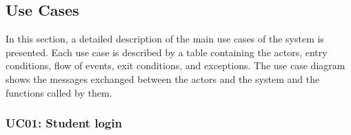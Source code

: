 \subsection{Use Cases}
\label{subsec:use-cases}

\par In this section, a detailed description of the main use cases of the system is presented. 
Each use case is described by a table containing the actors, entry conditions, flow of events, exit conditions, and exceptions.
The use case diagram shows the messages exchanged between the actors and the system and the functions called by them.


\subsubsection{UC01: Student login}
\label{subsubsec:student-login}

